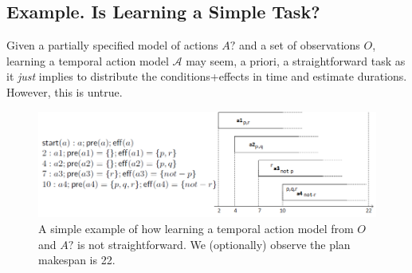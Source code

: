 \documentclass[runningheads]{llncs}
\newcommand{\tup}[1]{{\langle #1 \rangle}}
\newcommand{\pre}{\mathsf{pre}}    %
\newcommand{\eff}{\mathsf{eff}}    %
\newcommand{\obs}{\mathsf{obs}}    %
\newcommand{\start}{\mathsf{start}}%
\begin{document}





\subsection{Example. Is Learning a Simple Task?}
\label{sec:simpleTask}

Given a partially specified model of actions $A?$ and a set of observations $O$, learning a temporal action model $\mathcal{A}$  may seem, a priori, a straightforward task as it \emph{just} implies to distribute the conditions+effects in time and estimate durations. However, this is untrue.


\begin{figure}
\center \includegraphics[width=12cm]{ejemploacciones2.png}
\caption{A simple example of how learning a temporal action model from $O$ and $A?$ is not straightforward. We (optionally) observe the plan makespan is 22.}
\label{fig:exampleplantrace}
\end{figure}
\end{document}
